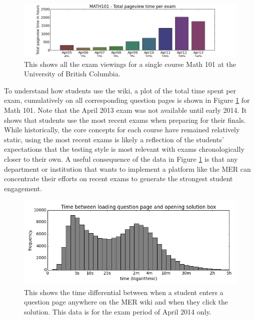 \documentclass{primus}
\begin{document}
\begin{figure}[H]
\centering
\includegraphics[width=\textwidth]{figs/total_pageview_per_exam_101.png}
\caption{This shows all the exam viewings for a single course Math 101 at the University of British Columbia.}\label{fig:total_pageview_per_exam_101}
\end{figure}

\noindent{}To understand how students use the wiki, a plot of the total time spent per exam, cumulatively on all corresponding question pages is shown in Figure \ref{fig:total_pageview_per_exam_101} for Math 101. Note that the April 2013 exam was not available until early 2014. It shows that students use the most recent exams when preparing for their finals. While historically, the core concepts for each course have remained relatively static, using the most recent exams is likely a reflection of the students’ expectations that the testing style is most relevant with exams chronologically closer to their own. A useful consequence of the data in Figure \ref{fig:total_pageview_per_exam_101} is that any department or institution that wants to implement a platform like the MER can concentrate their efforts on recent exams to generate the strongest student engagement.

\begin{figure}[H]
\centering
\includegraphics[width=\textwidth]{figs/2013_Term2_delta_t.png}
\caption{This shows the time differential between when a student enters a question page anywhere on the MER wiki and when they click the solution. This data is for the exam period of April 2014 only.}\label{fig:2013_Term2_delta_t}
\end{figure}
\end{document}
